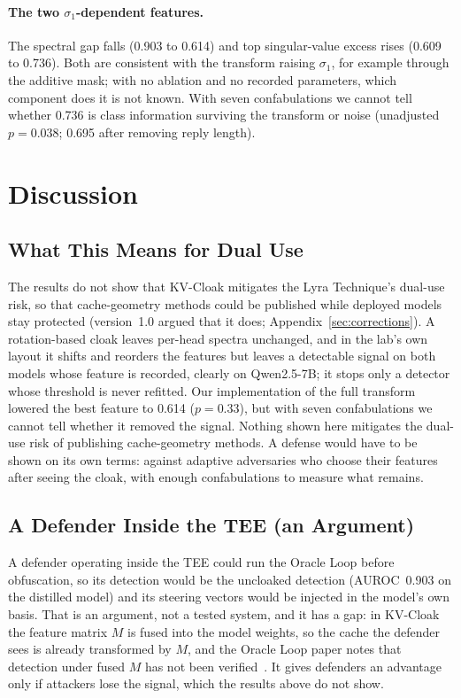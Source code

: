 \documentclass[11pt,a4paper]{article}
\begin{document}
\paragraph{The two $\sigma_1$-dependent features.}
The spectral gap falls (0.903 to 0.614) and top singular-value excess
rises (0.609 to 0.736). Both are consistent with the transform raising
$\sigma_1$, for example through the additive mask; with no ablation and no
recorded parameters, which component does it is not known. With seven
confabulations we cannot tell whether 0.736 is class information
surviving the transform or noise (unadjusted $p = 0.038$; 0.695 after
removing reply length).

\section{Discussion}

\subsection{What This Means for Dual Use}

The results do not show that KV-Cloak mitigates the Lyra Technique's
dual-use risk, so that cache-geometry methods could be published while
deployed models stay protected (version~1.0 argued that it does;
Appendix~\ref{sec:corrections}). A rotation-based cloak leaves per-head spectra unchanged, and in the lab's
own layout it shifts and reorders the features but leaves a detectable
signal on both models whose feature is recorded, clearly on Qwen2.5-7B;
it stops only a detector whose threshold is never refitted. Our
implementation of the full transform lowered the best feature to 0.614
($p = 0.33$), but with seven confabulations we cannot tell whether it
removed the signal.
Nothing shown here mitigates the dual-use risk of publishing
cache-geometry methods. A defense would have to be shown on its own
terms: against adaptive adversaries who choose their features after
seeing the cloak, with enough confabulations to measure what remains.

\subsection{A Defender Inside the TEE (an Argument)}

A defender operating inside the TEE could run the Oracle Loop before
obfuscation, so its detection would be the uncloaked detection (AUROC~0.903
on the distilled model) and its steering vectors would be injected in the
model's own basis. That is an argument, not a tested system, and it has a
gap: in KV-Cloak the feature matrix $M$ is fused into the model weights,
so the cache the defender sees is already transformed by $M$, and the
Oracle Loop paper notes that detection under fused $M$ has not been
verified~\citep{lyra2026oracle}. It gives defenders an advantage only if
attackers lose the signal, which the results above do not show.
\end{document}
